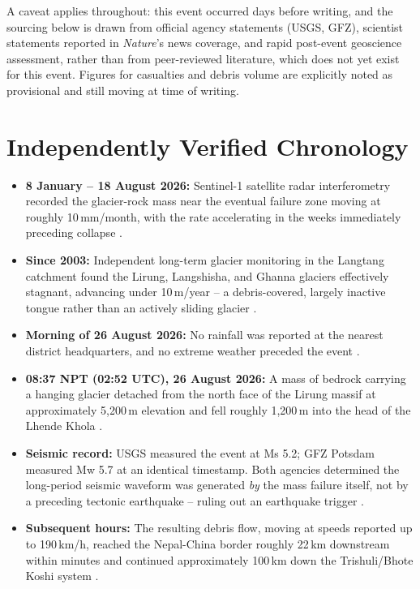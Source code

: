 \documentclass[11pt,twocolumn]{article}
\begin{document}
A caveat applies throughout: this event occurred days before writing, and the sourcing below is drawn from official agency statements (USGS, GFZ), scientist statements reported in \textit{Nature}'s news coverage, and rapid post-event geoscience assessment, rather than from peer-reviewed literature, which does not yet exist for this event. Figures for casualties and debris volume are explicitly noted as provisional and still moving at time of writing.

\section{Independently Verified Chronology}
\begin{itemize}
\item \textbf{8 January -- 18 August 2026:} Sentinel-1 satellite radar interferometry recorded the glacier-rock mass near the eventual failure zone moving at roughly 10\,mm/month, with the rate accelerating in the weeks immediately preceding collapse \cite{nature2026sat}.
\item \textbf{Since 2003:} Independent long-term glacier monitoring in the Langtang catchment found the Lirung, Langshisha, and Ghanna glaciers effectively stagnant, advancing under 10\,m/year -- a debris-covered, largely inactive tongue rather than an actively sliding glacier \cite{geoscopy2026}.
\item \textbf{Morning of 26 August 2026:} No rainfall was reported at the nearest district headquarters, and no extreme weather preceded the event \cite{antarcticglaciers2026,wiki2026floods}.
\item \textbf{08:37 NPT (02:52 UTC), 26 August 2026:} A mass of bedrock carrying a hanging glacier detached from the north face of the Lirung massif at approximately 5,200\,m elevation and fell roughly 1,200\,m into the head of the Lhende Khola \cite{unda2026}.
\item \textbf{Seismic record:} USGS measured the event at Ms 5.2; GFZ Potsdam measured Mw 5.7 at an identical timestamp. Both agencies determined the long-period seismic waveform was generated \emph{by} the mass failure itself, not by a preceding tectonic earthquake -- ruling out an earthquake trigger \cite{wiki2026floods}.
\item \textbf{Subsequent hours:} The resulting debris flow, moving at speeds reported up to 190\,km/h, reached the Nepal-China border roughly 22\,km downstream within minutes and continued approximately 100\,km down the Trishuli/Bhote Koshi system \cite{unda2026,conversation2026}.

\end{itemize}
\end{document}

